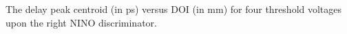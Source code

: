 \label{fig:thresholdtest} The delay peak centroid (in ps) versus DOI (in mm) for four threshold voltages upon the right NINO discriminator.
